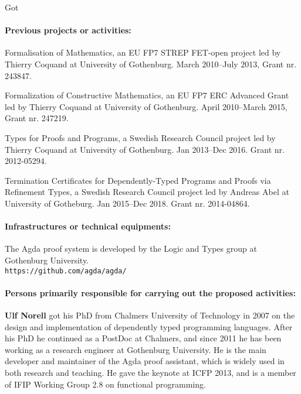 \begin{sitedescription}{Got}
\paragraph*{Previous projects or activities:}
\begin{compactitem}
\item Formalisation of Mathematics, an EU FP7 STREP FET-open project led by
Thierry Coquand at University of Gothenburg. March 2010--July 2013, Grant
nr. 243847.
\item Formalization of Constructive Mathematics, an EU FP7 ERC Advanced
Grant led by Thierry Coquand at University of Gothenburg. April
2010--March 2015, Grant nr. 247219.
\item Types for Proofs and Programs, a Swedish Research Council project led
by Thierry Coquand at University of Gothenburg. Jan 2013--Dec 2016. Grant
nr. 2012-05294.
\item Termination Certificates for Dependently-Typed Programs and Proofs
via Refinement Types, a Swedish Research Council project led by Andreas
Abel at University of Gotheburg. Jan 2015--Dec 2018. Grant nr. 2014-04864.
\end{compactitem}

\paragraph*{Infrastructures or technical equipments:}
\begin{compactitem}
\item The Agda proof system is developed by the Logic and Types group at
Gothenburg University. \\ {\tt https://github.com/agda/agda/}
\end{compactitem}

\paragraph*{Persons primarily responsible for carrying out the proposed activities:}

\begin{compactitem}
\item{\bf Ulf Norell} got his PhD from Chalmers University of Technology in
2007 on the design and implementation of dependently typed programming
languages. After his PhD he continued as a PostDoc at Chalmers, and since
2011 he has been working as a research engineer at Gothenburg University.
He is the main developer and maintainer of the Agda proof assistant, which
is widely used in both research and teaching. He gave the keynote at ICFP
2013, and is a member of IFIP Working Group 2.8 on functional programming.
\end{compactitem}

\end{sitedescription}

